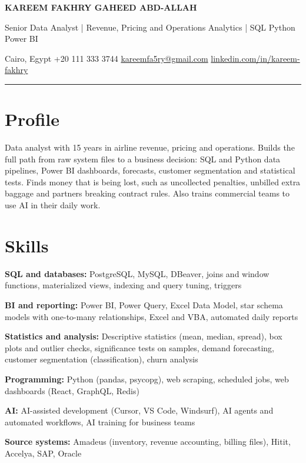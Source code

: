 \documentclass[10pt,a4paper]{article}
\begin{document}
{\LARGE\bfseries KAREEM FAKHRY GAHEED ABD-ALLAH}\par\vspace{3pt}
{\color{muted}Senior Data Analyst  |  Revenue, Pricing and Operations Analytics  |  SQL \textperiodcentered{} Python \textperiodcentered{} Power BI}\par\vspace{3pt}
{\small\color{muted}Cairo, Egypt \enspace\textperiodcentered\enspace +20 111 333 3744 \enspace\textperiodcentered\enspace \href{mailto:kareemfa5ry@gmail.com}{kareemfa5ry@gmail.com} \enspace\textperiodcentered\enspace \href{https://linkedin.com/in/kareem-fakhry}{linkedin.com/in/kareem-fakhry}}\par\vspace{2pt}
{\color{rule}\rule{\linewidth}{0.6pt}}

\section{Profile}
Data analyst with 15 years in airline revenue, pricing and operations. Builds the full path from raw system files to a business decision: SQL and Python data pipelines, Power BI dashboards, forecasts, customer segmentation and statistical tests. Finds money that is being lost, such as uncollected penalties, unbilled extra baggage and partners breaking contract rules. Also trains commercial teams to use AI in their daily work.\par

\section{Skills}
\textbf{SQL and databases:} PostgreSQL, MySQL, DBeaver, joins and window functions, materialized views, indexing and query tuning, triggers\par\vspace{1pt}
\textbf{BI and reporting:} Power BI, Power Query, Excel Data Model, star schema models with one-to-many relationships, Excel and VBA, automated daily reports\par\vspace{1pt}
\textbf{Statistics and analysis:} Descriptive statistics (mean, median, spread), box plots and outlier checks, significance tests on samples, demand forecasting, customer segmentation (classification), churn analysis\par\vspace{1pt}
\textbf{Programming:} Python (pandas, psycopg), web scraping, scheduled jobs, web dashboards (React, GraphQL, Redis)\par\vspace{1pt}
\textbf{AI:} AI-assisted development (Cursor, VS Code, Windsurf), AI agents and automated workflows, AI training for business teams\par\vspace{1pt}
\textbf{Source systems:} Amadeus (inventory, revenue accounting, billing files), Hitit, Accelya, SAP, Oracle\par\vspace{1pt}
\end{document}
